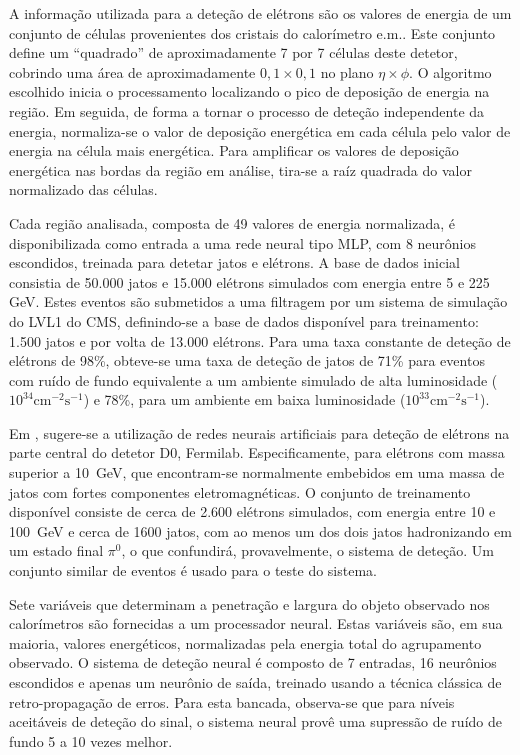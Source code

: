 A informação utilizada para a deteção de elétrons são os valores de energia de
um conjunto de células provenientes dos cristais do calorímetro e.m.. Este
conjunto define um ``quadrado'' de aproximadamente 7 por 7 células deste
detetor, cobrindo uma área de aproximadamente $0,1 \times 0,1$ no plano $\eta
\times \phi$. O algoritmo escolhido inicia o processamento localizando o pico
de deposição de energia na região. Em seguida, de forma a tornar o processo de
deteção independente da energia, normaliza-se o valor de deposição energética
em cada célula pelo valor de energia na célula mais energética. Para
amplificar os valores de deposição energética nas bordas da região em análise,
tira-se a raíz quadrada do valor normalizado das células.

Cada região analisada, composta de 49 valores de energia normalizada, é
disponibilizada como entrada a uma rede neural tipo MLP, com 8 neurônios
escondidos, treinada para detetar jatos e elétrons. A base de dados inicial
consistia de 50.000 jatos e 15.000 elétrons simulados com energia entre 5 e
225 GeV. Estes eventos são submetidos a uma filtragem por um sistema de
simulação do LVL1 do CMS, definindo-se a base de dados disponível para
treinamento: 1.500 jatos e por volta de 13.000 elétrons. Para uma taxa
constante de deteção de elétrons de 98\%, obteve-se uma taxa de deteção de
jatos de 71\% para eventos com ruído de fundo equivalente a um ambiente
simulado de alta luminosidade ($10^{34}\text{cm}^{-2}\text{s}^{-1}$) e 78\%,
para um ambiente em baixa luminosidade ($10^{33}\text{cm}^{-2}\text{s}^{-1}$).

Em \cite{chakraborty-acat-2001}, sugere-se a utilização de redes neurais
artificiais para deteção de elétrons na parte central do detetor D0,
Fermilab. Especificamente, para elétrons com massa superior a 10~GeV, que
encontram-se normalmente embebidos em uma massa de jatos com fortes
componentes eletromagnéticas. O conjunto de treinamento disponível consiste de
cerca de 2.600 elétrons simulados, com energia entre 10 e 100~GeV e cerca de
1600 jatos, com ao menos um dos dois jatos hadronizando em um estado final
$\pi^0$, o que confundirá, provavelmente, o sistema de deteção. Um conjunto
similar de eventos é usado para o teste do sistema.

Sete variáveis que determinam a penetração e largura do objeto observado nos
calorímetros são fornecidas a um processador neural. Estas variáveis são, em
sua maioria, valores energéticos, normalizadas pela energia total do
agrupamento observado. O sistema de deteção neural é composto de 7 entradas,
16 neurônios escondidos e apenas um neurônio de saída, treinado usando a
técnica clássica de retro-propagação de erros. Para esta bancada, observa-se
que para níveis aceitáveis de deteção do sinal, o sistema neural provê uma
supressão de ruído de fundo 5 a 10 vezes melhor.

